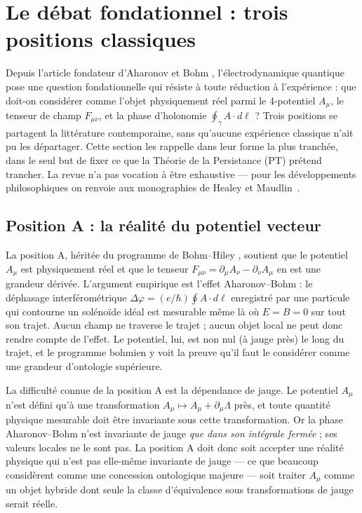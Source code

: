 \section{Le débat fondationnel : trois positions classiques}
\label{sec:debat}

Depuis l'article fondateur d'Aharonov et Bohm
\cite{AharonovBohm1959}, l'électrodynamique quantique pose une
question fondationnelle qui résiste à toute réduction à
l'expérience : que doit-on considérer comme l'objet physiquement
réel parmi le 4-potentiel $A_\mu$, le tenseur de champ
$F_{\mu\nu}$, et la phase d'holonomie
$\oint_\gamma A \cdot d\ell$ ? Trois positions se partagent la
littérature contemporaine, sans qu'aucune expérience classique
n'ait pu les départager. Cette section les rappelle dans leur
forme la plus tranchée, dans le seul but de fixer ce que la
Théorie de la Persistance (PT) prétend trancher. La revue n'a pas
vocation à être exhaustive --- pour les développements
philosophiques on renvoie aux monographies de Healey
\cite{Healey2007} et Maudlin~\cite{Maudlin2011}.

\subsection{Position A : la réalité du potentiel vecteur}
\label{ssec:position_A}

La position A, héritée du programme de Bohm--Hiley
\cite{BohmHiley1993}, soutient que le potentiel $A_\mu$ est
physiquement réel et que le tenseur $F_{\mu\nu} = \partial_\mu
A_\nu - \partial_\nu A_\mu$ en est une grandeur dérivée. L'argument
empirique est l'effet Aharonov--Bohm \cite{AharonovBohm1959} :
le déphasage interférométrique
$\Delta\varphi = (e/\hbar) \oint A \cdot d\ell$ enregistré par une
particule qui contourne un solénoïde idéal est mesurable même là
où $E = B = 0$ sur tout son trajet. Aucun champ ne traverse le
trajet ; aucun objet local ne peut donc rendre compte de l'effet.
Le potentiel, lui, est non nul (à jauge près) le long du trajet,
et le programme bohmien y voit la preuve qu'il faut le considérer
comme une grandeur d'ontologie supérieure.

La difficulté connue de la position A est la dépendance de jauge.
Le potentiel $A_\mu$ n'est défini qu'à une transformation
$A_\mu \mapsto A_\mu + \partial_\mu \Lambda$ près, et toute
quantité physique mesurable doit être invariante sous cette
transformation. Or la phase Aharonov--Bohm n'est invariante de
jauge \emph{que dans son intégrale fermée} ; ses valeurs locales
ne le sont pas. La position A doit donc soit accepter une réalité
physique qui n'est pas elle-même invariante de jauge --- ce que
beaucoup considèrent comme une concession ontologique majeure ---
soit traiter $A_\mu$ comme un objet hybride dont seule la classe
d'équivalence sous transformations de jauge serait réelle.

